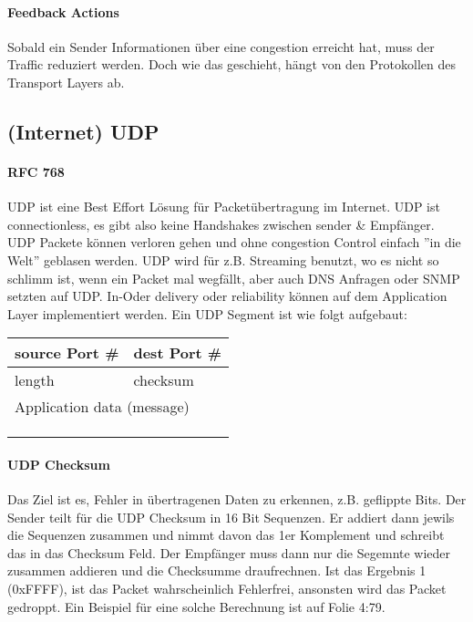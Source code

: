 			\paragraph{Feedback Actions}
				Sobald ein Sender Informationen über eine congestion erreicht hat, muss der Traffic reduziert werden. Doch wie das geschieht, hängt von den Protokollen des Transport Layers ab.

	\subsection{(Internet) UDP}
		\paragraph{RFC 768} 
			UDP ist eine Best Effort Lösung für Packetübertragung im Internet. UDP ist connectionless, es gibt also keine Handshakes zwischen sender \& Empfänger. UDP Packete können verloren gehen und ohne congestion Control einfach ''in die Welt'' geblasen werden. UDP wird für z.B. Streaming benutzt, wo es nicht so schlimm ist, wenn ein Packet mal wegfällt, aber auch DNS Anfragen oder SNMP setzten auf UDP. In-Oder delivery oder reliability können auf dem Application Layer implementiert werden. Ein UDP Segment ist wie folgt aufgebaut:
			\begin{table}[ht]
				\centering
				\begin{tabular}{|l|l|l|l|l|l|l|l|}
				\hline
				\multicolumn{4}{|l|}{source Port \#} & \multicolumn{4}{l|}{dest Port \#} \\ \hline
				\multicolumn{4}{|l|}{length}         & \multicolumn{4}{l|}{checksum}     \\ \hline
				\multicolumn{8}{|l|}{Application data (message)}        				 \\
				\multicolumn{8}{|l|}{}                                                   \\
				\multicolumn{8}{|l|}{}                                                   \\
				\multicolumn{8}{|l|}{}                                                   \\ \hline
				\end{tabular}
			\end{table}

		\paragraph{UDP Checksum}
			Das Ziel ist es, Fehler in übertragenen Daten zu erkennen, z.B. geflippte Bits. Der Sender teilt für die UDP Checksum in 16 Bit Sequenzen. Er addiert dann jewils die Sequenzen zusammen und nimmt davon das 1er Komplement und schreibt das in das Checksum Feld. Der Empfänger muss dann nur die Segemnte wieder zusammen addieren und die Checksumme draufrechnen. Ist das Ergebnis 1 (0xFFFF), ist das Packet wahrscheinlich Fehlerfrei, ansonsten wird das Packet gedroppt. Ein Beispiel für eine solche Berechnung ist auf Folie 4:79.

